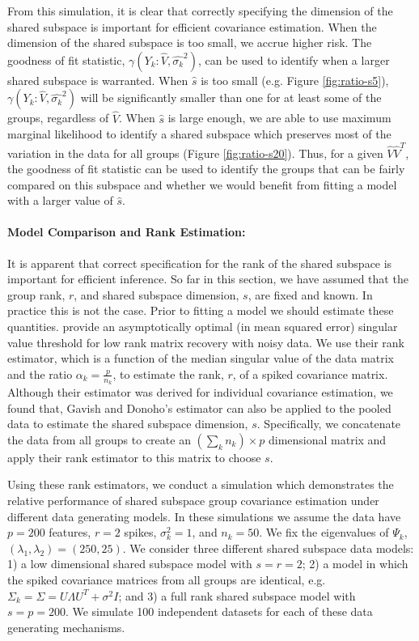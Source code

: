 \documentclass[12pt]{article}
\begin{document}
From this simulation, it is clear that correctly specifying the
dimension of the shared subspace is important for efficient covariance
estimation.  When the dimension of the shared subspace is too small,
we accrue higher risk.  The goodness of fit statistic,
$\gamma(Y_k: \hat{V}, \hat{\sigma_k}^2)$, can be used to identify when
a larger shared subspace is warranted.  When $\hat{s}$ is too small
(e.g. Figure \ref{fig:ratio-s5}),
$\gamma(Y_k: \hat{V}, \hat{\sigma_k}^2)$ will be significantly smaller
than one for at least some of the groups, regardless of $\hat{V}$.
When $\hat{s}$ is large enough, we are able to use maximum marginal
likelihood to identify a shared subspace which preserves most of the
variation in the data for all groups (Figure \ref{fig:ratio-s20}).
Thus, for a given $\hat{V}\hat{V}^T$, the goodness of fit statistic
can be used to identify the groups that can be fairly compared on this
subspace and whether we would benefit from fitting a model with a
larger value of $\hat{s}$.

\paragraph{Model Comparison and Rank Estimation:}

It is apparent that correct specification for the rank of the shared
subspace is important for efficient inference.  So far in this
section, we have assumed that the group rank, $r$, and shared subspace
dimension, $s$, are fixed and known.  In practice this is not the
case.  Prior to fitting a model we should estimate these quantities.
\citet{Gavish2014} provide an asymptotically optimal (in mean squared
error) singular value threshold for low rank matrix recovery with
noisy data.  We use their rank estimator, which is a function of the
median singular value of the data matrix and the ratio
$\alpha_k =\frac{p}{n_k}$, to estimate the rank, $r$, of a spiked
covariance matrix.  Although their estimator was derived for
individual covariance estimation, we found that, Gavish and Donoho's
estimator can also be applied to the pooled data to estimate the
shared subspace dimension, $s$.  Specifically, we concatenate the data
from all groups to create an $(\sum_k n_k) \times p$ dimensional
matrix and apply their rank estimator to this matrix to choose $s$.

Using these rank estimators, we conduct a simulation which
demonstrates the relative performance of shared subspace group
covariance estimation under different data generating models.  In
these simulations we assume the data have $p=200$ features, $r=2$
spikes, $\sigma^2_k=1$, and $n_k = 50$.  We fix the eigenvalues of
$\Psi_k$, $(\lambda_1, \lambda_2) = (250, 25)$.  We consider three
different shared subspace data models: 1) a low dimensional shared
subspace model with $s=r=2$; 2) a model in which the spiked covariance
matrices from all groups are identical, e.g.
$\Sigma_k = \Sigma = U\Lambda U^T + \sigma^2I$; and 3) a full rank
shared subspace model with $s=p=200$.  We simulate 100 independent
datasets for each of these data generating mechanisms.
\end{document}
